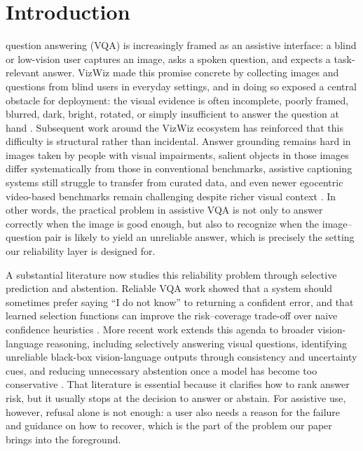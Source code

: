 \documentclass{ieeeaccess}
\begin{document}
\maketitle

\section{Introduction}
\label{sec:introduction}

 question answering (VQA) is increasingly framed as an assistive interface: a blind or low-vision user captures an image, asks a spoken question, and expects a task-relevant answer. VizWiz made this promise concrete by collecting images and questions from blind users in everyday settings, and in doing so exposed a central obstacle for deployment: the visual evidence is often incomplete, poorly framed, blurred, dark, bright, rotated, or simply insufficient to answer the question at hand \cite{gurari2018vizwiz}. Subsequent work around the VizWiz ecosystem has reinforced that this difficulty is structural rather than incidental. Answer grounding remains hard in images taken by people with visual impairments, salient objects in those images differ systematically from those in conventional benchmarks, assistive captioning systems still struggle to transfer from curated data, and even newer egocentric video-based benchmarks remain challenging despite richer visual context \cite{chen2022grounding,dognin2020captioning,reynolds2023salient,song2024videoqa}. In other words, the practical problem in assistive VQA is not only to answer correctly when the image is good enough, but also to recognize when the image--question pair is likely to yield an unreliable answer, which is precisely the setting our reliability layer is designed for.

A substantial literature now studies this reliability problem through selective prediction and abstention. Reliable VQA work showed that a system should sometimes prefer saying ``I do not know'' to returning a confident error, and that learned selection functions can improve the risk--coverage trade-off over naive confidence heuristics \cite{whitehead2022reliable,dancette2023improving}. More recent work extends this agenda to broader vision-language reasoning, including selectively answering visual questions, identifying unreliable black-box vision-language outputs through consistency and uncertainty cues, and reducing unnecessary abstention once a model has become too conservative \cite{eisenschlos2024selectively,khan2024consistency,srinivasan2024selective}. That literature is essential because it clarifies how to rank answer risk, but it usually stops at the decision to answer or abstain. For assistive use, however, refusal alone is not enough: a user also needs a reason for the failure and guidance on how to recover, which is the part of the problem our paper brings into the foreground.
\end{document}

